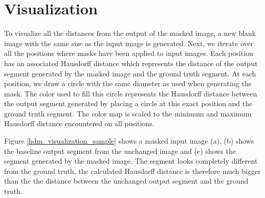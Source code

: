 \section{Visualization}

To visualize all the distances from the output of the masked image, a new blank image with the same size as the input image is generated. Next, we iterate over all the positions where masks have been
applied to input images. Each position has an associated Hausdorff distance which represents the distance of the output segment generated by the masked image and the ground truth segment.
At each position, we draw a circle with the same diameter as used when generating the mask. The color used to fill this circle represents the Hausdorff distance between the output segment generated by placing a circle at this exact position and the ground truth segment. The color map is scaled to the minimum and maximum Hausdorff distance encountered on all positions.

Figure \ref{hdm_visualization_sample} shows a masked input image (a), (b) shows the baseline output segment from the unchanged image and (c) shows the segment generated by the masked image.
The segment looks completely different from the ground truth, the calculated Hausdorff distance is therefore much bigger than the the distance between the unchanged output segment and the ground truth.

